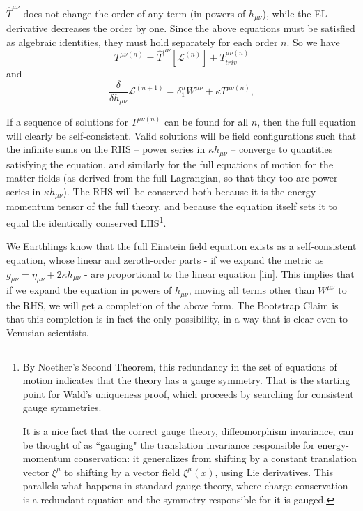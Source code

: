 \documentclass[aps,physrev,preprint,groupedaddress]{revtex4-2}
\begin{document}
\({\widehat{T}}^{\mu\nu}\) does not change the order of any term (in powers of \(h_{\mu\nu}\)), while the EL derivative decreases the order by one. Since the above equations must be satisfied as algebraic identities, they must hold separately for each order \(n\). So we have
\begin{equation}
T^{\mu\nu(n)}={\widehat{T}}^{\mu\nu}\left\lbrack \mathcal{L}^{(n)} \right\rbrack+T_{triv}^{\mu\nu(n)}
\end{equation}
and
\begin{equation}
\frac{\delta}{\delta h_{\mu\nu}}\mathcal{L}^{(n+1)}=\delta_1^n W^{\mu\nu}+\kappa T^{\mu\nu(n)},
\end{equation}

If a sequence of solutions for \(T^{\mu\nu(n)}\) can be found for all \(n\), then the full equation will clearly be self-consistent. Valid solutions will be field configurations such that the infinite sums on the RHS -- power series in \(\kappa h_{\mu\nu}\) --  converge to quantities satisfying the equation, and similarly for the full equations of motion for the matter fields (as derived from the full Lagrangian, so that they too are power series in \(\kappa h_{\mu\nu}\)). The RHS will be conserved both because it is the energy-momentum tensor of the full theory, and because the equation itself sets it to equal the identically conserved LHS\footnote{By Noether's Second Theorem, this redundancy in the set of equations of motion indicates that the theory has a gauge symmetry. That is the starting point for Wald's uniqueness proof\cite{Wald}, which proceeds by searching for consistent gauge symmetries. 

It is a nice fact that the correct gauge theory, diffeomorphism invariance, can be thought of as ``gauging" the translation invariance responsible for energy-momentum conservation: it generalizes from shifting by a constant translation vector \(\xi^\mu\) to shifting by a vector field \(\xi^\mu(x)\), using Lie derivatives. This parallels what happens in standard gauge theory, where charge conservation is a redundant equation and the symmetry responsible for it is gauged.}.

We Earthlings know that the full Einstein field equation exists as a self-consistent equation, whose linear and zeroth-order parts - if we expand the metric as \(g_{\mu\nu}=\eta_{\mu\nu}+2\kappa h_{\mu\nu}\) - are proportional to the linear equation \eqref{lin}. This implies that if we expand the equation in powers of \(h_{\mu\nu}\), moving all terms other than \(W^{\mu\nu}\) to the RHS, we will get a completion of the above form. The Bootstrap Claim is that this completion is in fact the only possibility, in a way that is clear even to Venusian scientists.
\end{document}
